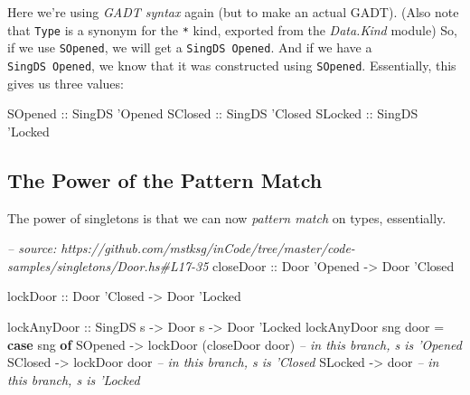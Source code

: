 \documentclass[]{article}
\newenvironment{Shaded}{\begin{snugshade}}{\end{snugshade}}
\newcommand{\CharTok}[1]{\textcolor[rgb]{0.31,0.60,0.02}{#1}}
\newcommand{\CommentTok}[1]{\textcolor[rgb]{0.56,0.35,0.01}{\textit{#1}}}
\newcommand{\DataTypeTok}[1]{\textcolor[rgb]{0.13,0.29,0.53}{#1}}
\newcommand{\FunctionTok}[1]{\textcolor[rgb]{0.00,0.00,0.00}{#1}}
\newcommand{\KeywordTok}[1]{\textcolor[rgb]{0.13,0.29,0.53}{\textbf{#1}}}
\newcommand{\NormalTok}[1]{#1}
\newcommand{\OtherTok}[1]{\textcolor[rgb]{0.56,0.35,0.01}{#1}}
\begin{document}
Here we're using \emph{GADT syntax} again (but to make an actual GADT). (Also
note that \texttt{Type} is a synonym for the \texttt{*} kind, exported from the
\emph{Data.Kind} module) So, if we use \texttt{SOpened}, we will get a
\texttt{SingDS\ \textquotesingle{}Opened}. And if we have a
\texttt{SingDS\ \textquotesingle{}Opened}, we know that it was constructed using
\texttt{SOpened}. Essentially, this gives us three values:

\begin{Shaded}
\begin{Highlighting}[]
\DataTypeTok{SOpened}\OtherTok{ ::} \DataTypeTok{SingDS} \CharTok{'Opened}
\DataTypeTok{SClosed}\OtherTok{ ::} \DataTypeTok{SingDS} \CharTok{'Closed}
\DataTypeTok{SLocked}\OtherTok{ ::} \DataTypeTok{SingDS} \CharTok{'Locked}
\end{Highlighting}
\end{Shaded}

\hypertarget{the-power-of-the-pattern-match}{%
\subsection{The Power of the Pattern
Match}\label{the-power-of-the-pattern-match}}

The power of singletons is that we can now \emph{pattern match} on types,
essentially.

\begin{Shaded}
\begin{Highlighting}[]
\CommentTok{-- source: https://github.com/mstksg/inCode/tree/master/code-samples/singletons/Door.hs#L17-35}
\OtherTok{closeDoor ::} \DataTypeTok{Door} \CharTok{'Opened -> Door '}\DataTypeTok{Closed}

\OtherTok{lockDoor ::} \DataTypeTok{Door} \CharTok{'Closed -> Door '}\DataTypeTok{Locked}

\OtherTok{lockAnyDoor ::} \DataTypeTok{SingDS}\NormalTok{ s }\OtherTok{->} \DataTypeTok{Door}\NormalTok{ s }\OtherTok{->} \DataTypeTok{Door} \CharTok{'Locked}
\NormalTok{lockAnyDoor sng door }\FunctionTok{=} \KeywordTok{case}\NormalTok{ sng }\KeywordTok{of}
    \DataTypeTok{SOpened} \OtherTok{->}\NormalTok{ lockDoor (closeDoor door) }\CommentTok{-- in this branch, s is 'Opened}
    \DataTypeTok{SClosed} \OtherTok{->}\NormalTok{ lockDoor door             }\CommentTok{-- in this branch, s is 'Closed}
    \DataTypeTok{SLocked} \OtherTok{->}\NormalTok{ door                      }\CommentTok{-- in this branch, s is 'Locked}
\end{Highlighting}
\end{Shaded}
\end{document}
